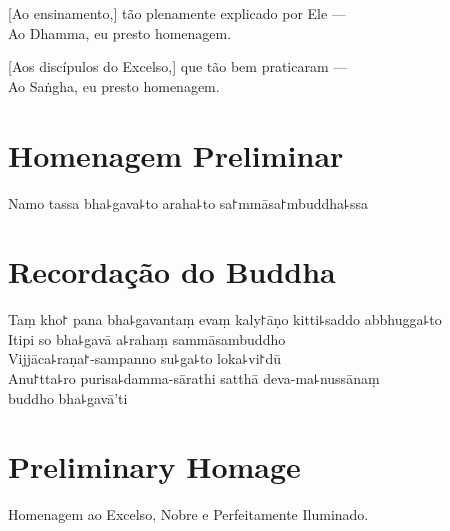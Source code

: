 [Ao ensinamento,] tão plenamente explicado por Ele ---\\
 Ao Dhamma, eu presto homenagem. 

[Aos discípulos do Excelso,] que tão bem praticaram ---\\
Ao Saṅgha, eu presto homenagem. 

\clearpage

\chapter*{Homenagem Preliminar}

\begin{leader}
\end{leader}

Namo tassa bha꜕gava꜕to araha꜕to sa꜓mmāsa꜓mbuddha꜕ssa


\chapter*{Recordação do Buddha}

\delegateSetUseNext

\begin{leader}
\end{leader}

Taṃ kho꜓ pana bha꜕gavantaṃ evaṃ kaly꜓āṇo kitti꜕saddo abbhugga꜕to\\
Itipi so bha꜕gavā a꜕rahaṃ sammāsambuddho\\
Vijjāca꜕raṇa꜓-sampanno su꜕ga꜕to loka꜕vi꜓dū\\
Anu꜓tta꜕ro purisa꜕damma-sārathi satthā deva-ma꜕nussānaṃ\\
\vin buddho bha꜕gavā'ti

\clearpage

\chapter{Preliminary Homage}

\begin{leader}
\end{leader}

Homenagem ao Excelso, Nobre e Perfeitamente Iluminado.


\nextChapterUseDelegatedPageNumber

